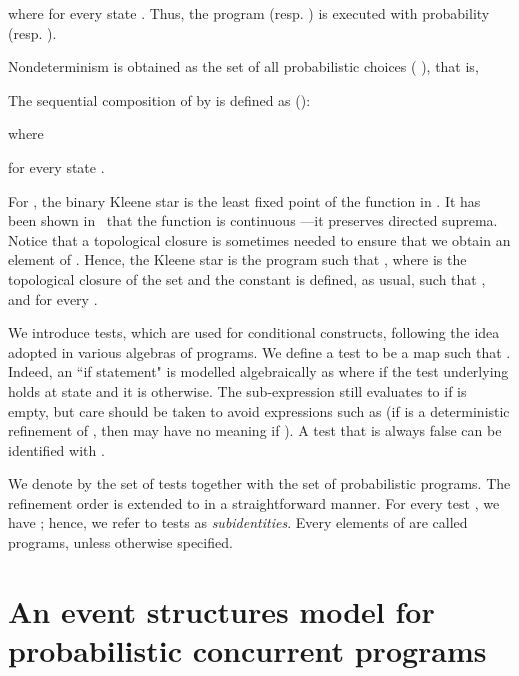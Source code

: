 \documentclass[review]{elsart}
\newcommand{\Defs}[1]{Def. #1}
\begin{document}
where  for every state . Thus, the program  (resp. ) is executed  with probability  (resp. ).

Nondeterminism is obtained as the set of all probabilistic choices (\cite[\Defs{5.4.6}]{Mci04} ), that is, 

The sequential composition of  by  is defined as (\cite[\Defs{5.4.7}]{Mci04}):

where 

for every state . 





For , the binary Kleene star  is the least fixed point of the function  in . It has been shown in~\cite{Mci04} that the function  is continuous ---it preserves directed suprema. Notice that a topological closure is sometimes needed to ensure that we obtain an element of . Hence, the Kleene star  is the program such that
,
where  is the topological closure of the set  and the constant  is defined, as usual, such that ,  and  for every .








We introduce tests, which are used for conditional constructs, following the idea adopted in various algebras of programs. We define a test to be a map  such that . Indeed, an ``if statement" is modelled algebraically as  where  if the test underlying  holds at state  and it is  otherwise. The sub-expression  still evaluates to  if  is empty, but care should be taken to avoid expressions such as  (if  is a deterministic refinement of , then  may have no meaning if ). A test that is always false can be identified with .

We denote by  the set of tests together with the set of probabilistic programs. The refinement order  is extended to  in a straightforward manner. For every test , we have ; hence, we refer to tests as \emph{subidentities}. Every elements of  are called programs, unless otherwise specified.





\section{An event structures model for probabilistic concurrent programs}\label{sec:es}
\end{document}
